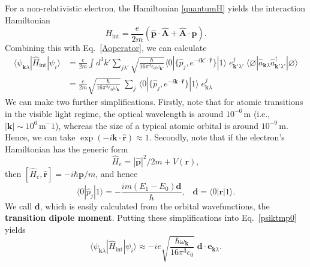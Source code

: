 \documentclass[prx,12pt]{revtex4-2}
\begin{document}
For a non-relativistic electron, the Hamiltonian \eqref{quantumH}
yields the interaction Hamiltonian
\begin{equation}
  H_{\mathrm{int}} = \frac{e}{2m} \left( \hat{\mathbf{p}} \cdot \hat{\mathbf{A}}
  + \hat{\mathbf{A}} \cdot \hat{\mathbf{p}} \right).
\end{equation}
Combining this with Eq.~\eqref{Aoperator}, we can calculate
\begin{align}
  \langle \psi_{\mathbf{k}\lambda}| \hat{H}_{\mathrm{int}}|\psi_i\rangle
  &= \frac{e}{2m} \int d^3 k' \sum_{j\lambda'}
  \sqrt{\frac{\hbar}{16\pi^3\epsilon_0 \omega_{\mathbf{k}'}}}
  \langle 0 | \{\hat{p}_j ,  e^{-i\mathbf{k}'\cdot\hat{\mathbf{r}}} \} | 1 \rangle
 \; e_{\mathbf{k}'\lambda'}^j \;
 \langle\varnothing|\hat{a}_{\mathbf{k}\lambda}
  \hat{a}_{\mathbf{k}'\lambda'}^\dagger|\varnothing\rangle \nonumber \\
  &= \frac{e}{2m} 
  \sqrt{\frac{\hbar}{16\pi^3\epsilon_0 \omega_{\mathbf{k}}}} \; \sum_{j}\,
  \langle 0 | \{\hat{p}_j ,  e^{-i\mathbf{k}\cdot\hat{\mathbf{r}}} \} | 1 \rangle
  \; e_{\mathbf{k}\lambda}^j
  \label{psiktmp0}
\end{align}
We can make two further simplifications.  Firstly, note that for
atomic transitions in the visible light regime, the optical wavelength
is around $10^{-6}\,\textrm{m}$ (i.e., $|\mathbf{k}| \sim
10^{6}\,\textrm{m}^-1$), whereas the size of a typical atomic orbital
is around $10^{-9}\,\textrm{m}$.  Hence, we can take
$\exp(-i\mathbf{k}\cdot\hat{\mathbf{r}}) \approx 1$.  Secondly, note
that if the electron's Hamiltonian has the generic form
\begin{equation}
  \hat{H}_e = |\hat{\mathbf{p}}|^2/2m + V(\mathbf{r}),
\end{equation}
then $[\hat{H}_e, \hat{\mathbf{r}}] = -i\hbar\mathbf{p}/m$, and hence
\begin{equation}
  \langle 0|\hat{p}_j|1\rangle = - \frac{im (E_1 - E_0) \mathbf{d}}{\hbar},
  \;\;\; \mathbf{d} = \langle 0 |\mathbf{r} | 1\rangle.
  \label{pbraket}
\end{equation}
We call $\mathbf{d}$, which is easily calculated from the orbital
wavefunctions, the \textbf{transition dipole moment}.  Putting these
simplifications into Eq.~\eqref{psiktmp0} yields
\begin{equation}
  \langle \psi_{\mathbf{k}\lambda}| \hat{H}_{\mathrm{int}}|\psi_i\rangle
  \approx -i e
  \sqrt{\frac{\hbar \omega_{\mathbf{k}}}{16\pi^3\epsilon_0}} \;
  \mathbf{d} \cdot \mathbf{e}_{\mathbf{k}\lambda}.
  \label{psiktmp}
\end{equation}
\end{document}
